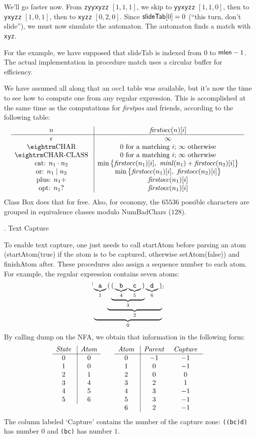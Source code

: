 We'll go faster now.  From {\tt zyyxyzz} $[1, 1, 1]$, we skip to {\tt yyxyzz} $[1, 1, 0]$, then to {\tt yxyzz} $[1, 0, 1]$, then to {\tt xyzz} $[0, 2, 0]$.  Since $\hbox{\sf slideTab}[0] = 0$ (``this turn, don't slide''), we must now simulate the automaton.  The automaton finds a match with {\tt xyz}.

For the example, we have supposed that {\sf slideTab} is indexed from $0$ to $\hbox{\sf mlen} - 1$.  The actual implementation in procedure {\sf match} uses a circular buffer for efficiency.

We have assumed all along that an {\sf occ1} table was available, but it's now the time to see how to compute one from any regular expression.  This is accomplished at the same time as the computations for {\it firstpos} and friends, according to the following table:  $$\vbox{\halign{\g{#}\vrule && \g{$#$} \cr
  $n$                   & {\it firstocc}(n)[i] \cr
\noalign{\hrule}
  $\epsilon$            & \infty \cr
  \tok{char}            & \hbox{$0$ for a matching $i$; $\infty$ otherwise} \cr
  \tok{char-class}      & \hbox{$0$ for a matching $i$; $\infty$ otherwise} \cr
  cat: $n_1 \cdot n_2$  & \min\smash{\bigl\{}{\it firstocc}(n_1)[i],\ {\it minl}(n_1) + {\it firstocc}(n_2)[i]\smash{\bigr\}} \cr
  or: $n_1 \mid n_2$    & \min\smash{\bigl\{}{\it firstocc}(n_1)[i],\ {\it firstocc}(n_2)[i]\smash{\bigr\}} \cr
  plus: $n_1+$          & {\it firstocc}(n_1)[i] \cr
  opt: $n_1?$           & {\it firstocc}(n_1)[i] \cr
}}$$  Class {\sf Box} does that for free.  Also, for economy, the $65536$ possible characters are grouped in equivalence classes modulo {\sf NumBadChars} ($128$).

. Text Capture

To enable text capture, one just needs to call {\sf startAtom} before parsing an atom ({\sf startAtom(true)} if the atom is to be captured, otherwise {\sf setAtom(false)}) and {\sf finishAtom} after.  These procedures also assign a sequence number to each atom.  For example, the regular expression  contains seven atoms:  $$\hbox{{$^{\scriptscriptstyle\lceil}$\tt$\underbrace{\underbrace{\tt a}_1\underbrace{{\tt (}\underbrace{{\tt (}\underbrace{\tt b}_4\underbrace{\tt c}_5{\tt )}}_3\underbrace{\tt d}_6{\tt )}}_2}_0$$\scriptscriptstyle\rfloor$}}$$  By calling {\sf dump} on the NFA, we obtain that information in the following form: $$\vtop{\halign{\g{$#$} \vrule & \g{$#$}\cr
  {\it State\/} & {\it Atom\/} \cr
\noalign{\hrule}
  0             & 0 \cr
  1             & 0 \cr
  2             & 1 \cr
  3             & 4 \cr
  4             & 5 \cr
  5             & 6 \cr
}}\qquad\vtop{\halign{\g{$#$} \vrule && \g{$#$} \cr
  {\it Atom\/} & {\it Parent\/} & {\it Capture\/} \cr
\noalign{\hrule}
  0            &  -1            & -1 \cr
  1            &  0             & -1 \cr
  2            &  0             &  0 \cr
  3            &  2             &  1 \cr
  4            &  3             & -1 \cr
  5            &  3             & -1 \cr
  6            &  2             & -1 \cr
}}$$  The column labeled `Capture' contains the number of the capture zone:  {\tt ((bc)d)} has number $0$ and {\tt (bc)} has number $1$.

